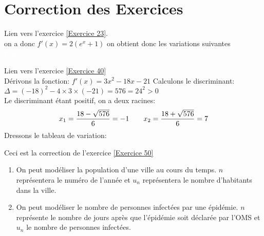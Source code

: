 \documentclass[12pt,fleqn]{report} %
\begin{document}
\chapter{Correction des Exercices}
\begin{correction}Lien vers l'exercice   \ref{Exercice 23}.\\
	on a donc $f'(x) = 2(e^x+1)$
	on obtient donc les variations suivantes\\
	\textcolor{white}{rtbn}\\
	
	
\end{correction}
\begin{correction}Lien vers l'exercice   \ref{Exercice 40}\\
	Dérivons la fonction: $f'(x)= 3x^2- 18x-21$
	Calculons le discriminant: \\[2mm]
	$\Delta=(-18)^2-4 \times 3 \times (-21)= 576 = 24^2>0$\\[2mm]
	Le discriminant étant positif, on a deux racines: \\[2mm]
	\[
	x_1=\frac{18- \sqrt{576}}{6}=-1 \quad \quad
	x_2= \frac{18+\sqrt{576}}{6}=7\\[2mm]
	\]
	Dressons le tableau de variation: \\[2mm]
	\begin{center}
	\end{center}
\end{correction}


\begin{correction}
	Ceci est la correction de l'exercice \ref{Exercice 50}
	\begin{enumerate}
		\item On peut modéliser la population d'une ville au cours du temps. $n$ représentera le numéro de l'année et $u_n$ représentera le nombre d'habitants dans la ville.
		\item On peut modéliser le nombre de personnes infectées par une épidémie. $n$ représente le nombre de jours après que l'épidémie soit déclarée par l'OMS et $u_n$ le nombre de personnes infectées.
	\end{enumerate}
\end{correction}
\end{document}

